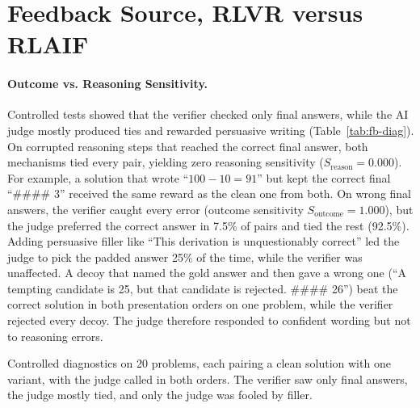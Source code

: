 \documentclass{article}
\newcommand{\tablebody}[1]{\small\setlength{\tabcolsep}{4pt}\begin{adjustbox}{max width=\linewidth}\end{adjustbox}}
\begin{document}
\section{Feedback Source, RLVR versus RLAIF}
\label{sec:feedback}

\paragraph{Outcome vs. Reasoning Sensitivity.} Controlled tests showed that the verifier checked only final answers, while the AI judge mostly produced ties and rewarded persuasive writing (Table~\ref{tab:fb-diag}). On corrupted reasoning steps that reached the correct final answer, both mechanisms tied every pair, yielding zero reasoning sensitivity ($S_{\text{reason}} = 0.000$). For example, a solution that wrote ``$100 - 10 = 91$'' but kept the correct final ``\#\#\#\# 3'' received the same reward as the clean one from both. On wrong final answers, the verifier caught every error (outcome sensitivity $S_{\text{outcome}} = 1.000$), but the judge preferred the correct answer in 7.5\% of pairs and tied the rest (92.5\%). Adding persuasive filler like ``This derivation is unquestionably correct'' led the judge to pick the padded answer 25\% of the time, while the verifier was unaffected. A decoy that named the gold answer and then gave a wrong one (``A tempting candidate is 25, but that candidate is rejected. \#\#\#\# 26'') beat the correct solution in both presentation orders on one problem, while the verifier rejected every decoy. The judge therefore responded to confident wording but not to reasoning errors.

\begin{table}[!htb]
  \centering
  \caption{Controlled diagnostics on 20 problems, each pairing a clean solution with one variant, with the judge called in both orders. The verifier saw only final answers, the judge mostly tied, and only the judge was fooled by filler.}
  \label{tab:fb-diag}
  \tablebody{tables/t5_diagnostics.tex}
\end{table}
\end{document}
